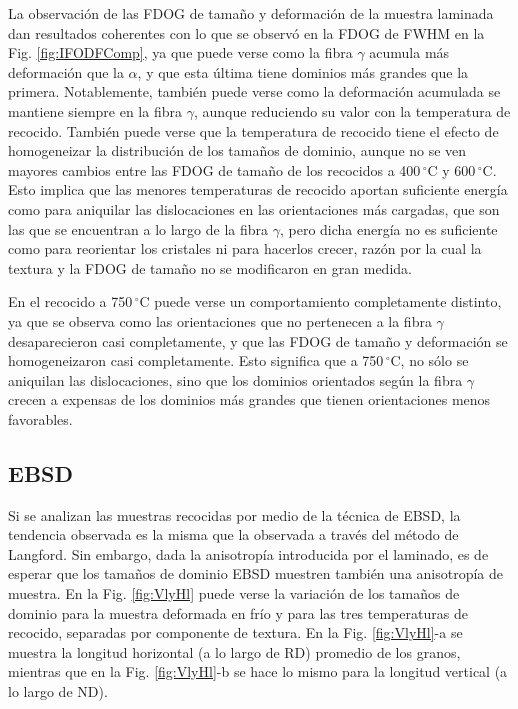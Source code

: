 La observación de las FDOG de tamaño y deformación de la muestra laminada dan resultados coherentes con lo que se observó en la FDOG de FWHM en la Fig. \ref{fig:IFODFComp}, ya que puede verse como la fibra $\gamma$ acumula más deformación que la $\alpha$, y que esta última tiene dominios más grandes que la primera.
Notablemente, también puede verse como la deformación acumulada se mantiene siempre en la fibra $\gamma$, aunque reduciendo su valor con la temperatura de recocido.
También puede verse que la temperatura de recocido tiene el efecto de homogeneizar la distribución de los tamaños de dominio, aunque no se ven mayores cambios entre las FDOG de tamaño de los recocidos a 400\,$^{\circ}$C y 600\,$^{\circ}$C.
Esto implica que las menores temperaturas de recocido aportan suficiente energía como para aniquilar las dislocaciones en las orientaciones más cargadas, que son las que se encuentran a lo largo de la fibra $\gamma$, pero dicha energía no es suficiente como para reorientar los cristales ni para hacerlos crecer, razón por la cual la textura y la FDOG de tamaño no se modificaron en gran medida.

En el recocido a 750\,$^{\circ}$C puede verse un comportamiento completamente distinto, ya que se observa como las orientaciones que no pertenecen a la fibra $\gamma$ desaparecieron casi completamente, y que las FDOG de tamaño y deformación se homogeneizaron casi completamente.
Esto significa que a 750\,$^{\circ}$C, no sólo se aniquilan las dislocaciones, sino que los dominios orientados según la fibra $\gamma$ crecen a expensas de los dominios más grandes que tienen orientaciones menos favorables.

\subsection{EBSD}\label{SS:IFRecLang}
Si se analizan las muestras recocidas por medio de la técnica de EBSD, la tendencia observada es la misma que la observada a través del método de Langford.
Sin embargo, dada la anisotropía introducida por el laminado, es de esperar que los tamaños de dominio EBSD muestren también una anisotropía de muestra.
En la Fig. \ref{fig:VlyHl} puede verse la variación de los tamaños de dominio para la muestra deformada en frío y para las tres temperaturas de recocido, separadas por componente de textura.
En la Fig. \ref{fig:VlyHl}-a se muestra la longitud horizontal (a lo largo de RD) promedio de los granos, mientras que en la Fig. \ref{fig:VlyHl}-b se hace lo mismo para la longitud vertical (a lo largo de ND).

